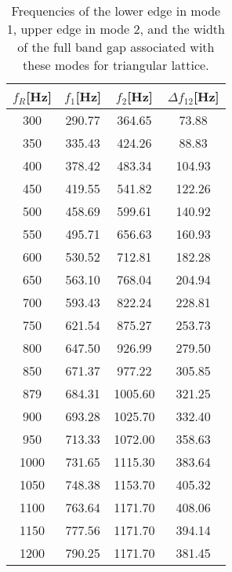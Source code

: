 \documentclass{article}
\begin{document}
\begin{table}[htb]
\centering
\caption{Frequencies of the lower edge in mode 1, upper edge in mode 2, and the width of the full band gap associated with these modes for triangular lattice.}
\label{tab300}
\begin{tabular}{cccc}
\hline
$f_R$[Hz] & $f_1$[Hz] & $f_2$[Hz] & $\Delta f _{12}$[Hz] \\ \hline
300 & 290.77 & 364.65 & 73.88 \\ \hline
350 & 335.43 & 424.26 & 88.83 \\ \hline
400 & 378.42 & 483.34 & 104.93 \\ \hline
450 & 419.55 & 541.82 & 122.26 \\ \hline
500 & 458.69 & 599.61 & 140.92 \\ \hline
550 & 495.71 & 656.63 & 160.93 \\ \hline
600 & 530.52 & 712.81 & 182.28 \\ \hline
650 & 563.10 & 768.04 & 204.94 \\ \hline
700 & 593.43 & 822.24 & 228.81 \\ \hline
750 & 621.54 & 875.27 & 253.73 \\ \hline
800 & 647.50 & 926.99 & 279.50 \\ \hline
850 & 671.37 & 977.22 & 305.85 \\ \hline
879 & 684.31 & 1005.60 & 321.25 \\ \hline
900 & 693.28 & 1025.70 & 332.40 \\ \hline
950 & 713.33 & 1072.00 & 358.63 \\ \hline
1000 & 731.65 & 1115.30 & 383.64 \\ \hline
1050 & 748.38 & 1153.70 & 405.32 \\ \hline
1100 & 763.64 & 1171.70 & 408.06 \\ \hline
1150 & 777.56 & 1171.70 & 394.14 \\ \hline
1200 & 790.25 & 1171.70 & 381.45 \\ \hline
\end{tabular}
\end{table}
\end{document}

